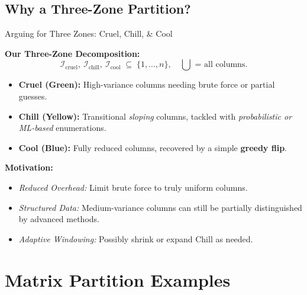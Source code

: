 \documentclass{beamer}
\begin{document}
\subsection*{Why a Three-Zone Partition?}
\begin{frame}{Arguing for Three Zones: Cruel, Chill, \& Cool}

\vspace{0.2cm}
\textbf{Our Three-Zone Decomposition:}
\[
  \mathcal{I}_{\mathrm{cruel}},\ 
  \mathcal{I}_{\mathrm{chill}},\ 
  \mathcal{I}_{\mathrm{cool}}
  \;\subseteq\;\{1,\dots,n\}, 
  \quad
  \bigcup \text{ = all columns.}
\]
\begin{itemize}
  \item \textbf{Cruel (Green):} 
    High-variance columns needing brute force or partial guesses.
  \item \textbf{Chill (Yellow):} 
    Transitional \emph{sloping} columns, tackled with \emph{probabilistic or ML-based} enumerations.
  \item \textbf{Cool (Blue):} 
    Fully reduced columns, recovered by a simple \textbf{greedy flip}.
\end{itemize}

\vspace{0.2cm}
\textbf{Motivation:}
\begin{itemize}
  \item \emph{Reduced Overhead:} Limit brute force to truly uniform columns.
  \item \emph{Structured Data:} Medium-variance columns can still be partially distinguished by advanced methods.
  \item \emph{Adaptive Windowing:} Possibly shrink or expand Chill as needed.
\end{itemize}
\end{frame}

\section{Matrix Partition Examples}
\end{document}
